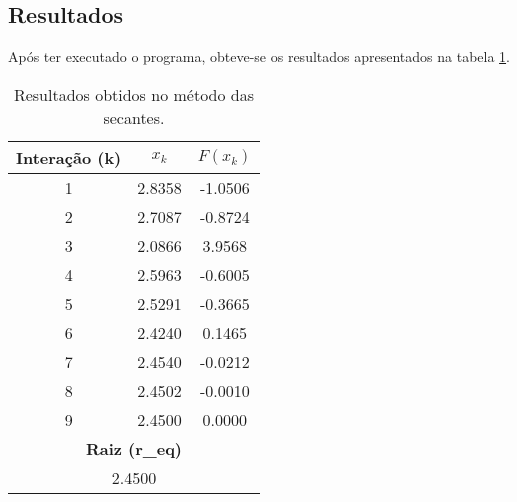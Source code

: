 \documentclass[a4paper,11pt, twoside]{article}
\newcommand{\n}[1]{\textbf{#1}}
\begin{document}
	{\linespread{1.15}
    }
    
    \subsection*{Resultados}
    Após ter executado o programa, obteve-se os resultados apresentados na tabela \ref{sec}.
    {\linespread{1}
	\begin{table}[!th]
		\begin{center}
		    \begin{tabular}{ c c c }
		        \toprule[0.11em]
		        \n{Interação (k)} & \n{$x_k$} & \n{$F(x_k)$}}\\
		        \toprule[0.11em]
				1 & 2.8358 & -1.0506\\
				\midrule
				2 & 2.7087 & -0.8724\\
				\midrule
				3 & 2.0866 & 3.9568\\
				\midrule
				4 & 2.5963 & -0.6005\\
				\midrule
				5 & 2.5291 & -0.3665\\
				\midrule
				6 & 2.4240 & 0.1465\\
				\midrule
				7 & 2.4540 & -0.0212\\
				\midrule
				8 & 2.4502 & -0.0010\\
				\midrule
				9 & 2.4500 & 0.0000\\
		        \toprule[0.11em]
		        \multicolumn{3}{c}{\n{Raiz (r_{eq})}}\\
		        \toprule[0.11em]
		        \multicolumn{3}{c}{2.4500}\\
		        \midrule
		    \end{tabular}
		\end{center}
		\caption{Resultados obtidos no método das secantes.\label{sec}}
	\end{table}}
\end{document}
